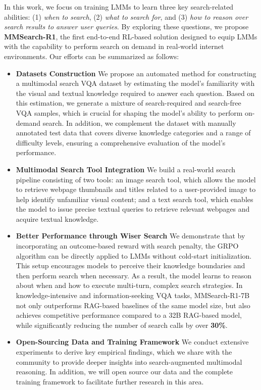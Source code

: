 \documentclass{article}
\begin{document}
In this work, we focus on training LMMs to learn three key search-related abilities: (1) \textit{when to search}, (2) \textit{what to search for}, and (3) \textit{how to reason over search results to answer user queries}. By exploring these questions, we propose \textbf{MMSearch-R1}, the first end-to-end RL-based solution designed to equip LMMs with the capability to perform search on demand in real-world internet environments. Our efforts can be summarized as follows:

\begin{itemize}
    \item \textbf{Datasets Construction} We propose an automated method for constructing a multimodal search VQA dataset by estimating the model's familiarity with the visual and textual knowledge required to answer each question. Based on this estimation, we generate a mixture of search-required and search-free VQA samples, which is crucial for shaping the model’s ability to perform on-demand search. In addition, we complement the dataset with manually annotated test data that covers diverse knowledge categories and a range of difficulty levels, ensuring a comprehensive evaluation of the model's performance.

    \item \textbf{Multimodal Search Tool Integration} We build a real-world search pipeline consisting of two tools: an image search tool, which allows the model to retrieve webpage thumbnails and titles related to a user-provided image to help identify unfamiliar visual content; and a text search tool, which enables the model to issue precise textual queries to retrieve relevant webpages and acquire textual knowledge.

    \item \textbf{Better Performance through Wiser Search} We demonstrate that by incorporating an outcome-based reward with search penalty, the GRPO algorithm \cite{rl/deepseekmath} can be directly applied to LMMs without cold-start initialization. This setup encourages models to perceive their knowledge boundaries and then perform search when necessary. As a result, the model learns to reason about when and how to execute multi-turn, complex search strategies. In knowledge-intensive and information-seeking VQA tasks, MMSearch-R1-7B not only outperforms RAG-based baselines of the same model size, but also achieves competitive performance compared to a 32B RAG-based model, while significantly reducing the number of search calls by over \textbf{30\%}.

    \item \textbf{Open-Sourcing Data and Training Framework} We conduct extensive experiments to derive key empirical findings, which we share with the community to provide deeper insights into search-augmented multimodal reasoning. In addition, we will open source our data and the complete training framework to facilitate further research in this area.
\end{itemize}
\end{document}
